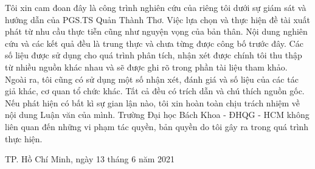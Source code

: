 \documentclass[12pt,a4paper,oneside]{book} %
\begin{document}
\begin{declaration}

Tôi xin cam đoan đây là công trình nghiên cứu của riêng tôi dưới sự giám sát và hướng dẫn của PGS.TS Quản Thành Thơ. Việc lựa chọn và thực hiện đề tài xuất phát từ nhu cầu thực tiễn cũng như nguyện vọng của bản thân. Nội dung nghiên cứu và các kết quả đều là trung thực và chưa từng được công bố trước đây. Các số liệu được sử dụng cho quá trình phân tích, nhận xét được chính tôi thu thập từ nhiều nguồn khác nhau và sẽ được ghi rõ trong phần tài liệu tham khảo.\\

Ngoài ra, tôi cũng có sử dụng một số nhận xét, đánh giá và số liệu của các tác giả khác, cơ quan tổ chức khác. Tất cả đều có trích dẫn và chú thích nguồn gốc.\\
	
Nếu phát hiện có bất kì sự gian lận nào, tôi xin hoàn toàn chịu trách nhiệm về nội dung Luận văn của mình. Trường Đại học Bách Khoa - ĐHQG - HCM không liên quan đến những vi phạm tác quyền, bản quyền do tôi gây ra trong quá trình thực hiện.

\begin{flushright}
TP. Hồ Chí Minh, ngày 13 tháng 6 năm 2021
\end{flushright}
{\hspace*{9.8cm}{Sinh viên thực hiện}}
\\
\\
\\
\\
{\hspace*{9.9cm}{Hồ Phương Ngọc}}
\end{declaration}

\tableofcontents

\listoftables
\listoffigures

\mainmatter

\fancyhead{}  %
\renewcommand{\footrulewidth}{0.4pt}
\renewcommand{\headrulewidth}{0.4pt}

\pagestyle{fancy}  %





% 







\cvpage
\end{document}
